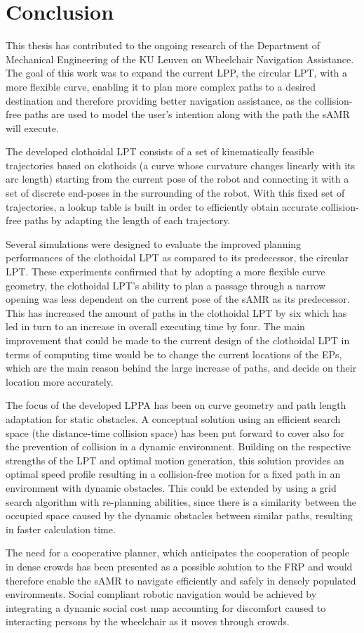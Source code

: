 \chapter{Conclusion} \label{cha:Concl}
This thesis has contributed to the ongoing research of the Department of Mechanical Engineering of the KU Leuven on Wheelchair Navigation Assistance. The goal of this work was to expand the current LPP, the circular LPT, with a more flexible curve, enabling it to plan more complex paths to a desired destination and therefore providing better navigation assistance, as the collision-free paths are used to model the user's intention along with the path the sAMR will execute.

The developed clothoidal LPT consists of a set of kinematically feasible trajectories based on clothoids (a curve whose curvature changes linearly with its arc length) starting from the current pose of the robot and connecting it with a set of discrete end-poses in the surrounding of the robot. With this fixed set of trajectories, a lookup table is built in order to efficiently obtain accurate collision-free paths by adapting the length of each trajectory.

Several simulations were designed to evaluate the improved planning performances of the clothoidal LPT as compared to its predecessor, the circular LPT. These experiments confirmed that by adopting a more flexible curve geometry, the clothoidal LPT’s ability to plan a passage through a narrow opening was less dependent on the current pose of the sAMR as its predecessor.  This has increased the amount of paths in the clothoidal LPT by six which has led in turn to an increase in overall executing time by four. The main improvement that could be made to the current design of the clothoidal LPT in terms of computing time would be to change the current locations of the EPs, which are the main reason behind the large increase of paths, and decide on their location more accurately.

The focus of the developed LPPA has been on curve geometry and path length adaptation for static obstacles. A conceptual solution using an efficient search space (the distance-time collision space) has been put forward to cover also for the prevention of collision in a dynamic environment. Building on the respective strengths of the LPT and optimal motion generation, this solution provides an optimal speed profile resulting in a collision-free motion for a fixed path in an environment with dynamic obstacles. This could be extended by using a grid search algorithm with re-planning abilities, since there is a similarity between the occupied space caused by the dynamic obstacles between similar paths, resulting in faster calculation time.

The need for a cooperative planner, which anticipates the cooperation of people in dense crowds has been presented as a possible solution to the FRP and would therefore enable the sAMR to navigate efficiently and safely in densely populated environments. Social compliant robotic navigation would be achieved by integrating a dynamic social cost map accounting for discomfort caused to interacting persons by the wheelchair as it moves through crowds.